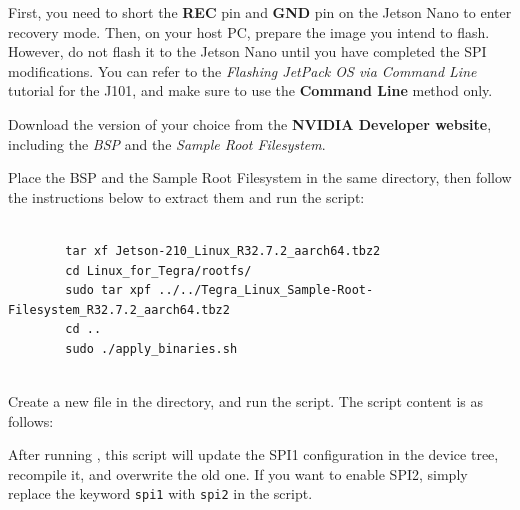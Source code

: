 First, you need to short the \textbf{REC} pin and \textbf{GND} pin on the Jetson Nano to enter recovery mode. 
Then, on your host PC, prepare the image you intend to flash. 
However, do not flash it to the Jetson Nano until you have completed the \ac{SPI} modifications. 
You can refer to the \textit{Flashing JetPack OS via Command Line} tutorial for the J101, and make sure to use the \textbf{Command Line} method only.

\bigskip
\noindent Download the version of your choice from the \textbf{NVIDIA Developer website}, including the \textit{BSP} and the \textit{Sample Root Filesystem}.

\noindent Place the BSP and the Sample Root Filesystem in the same directory, then follow the instructions below to extract them and run the  script:



\begin{tcolorbox}[colback=white,colframe=black,coltext= ShellColor, sharp corners, boxrule=0.8pt]
		\begin{small}
	\begin{verbatim}
		
		tar xf Jetson-210_Linux_R32.7.2_aarch64.tbz2
		cd Linux_for_Tegra/rootfs/
		sudo tar xpf ../../Tegra_Linux_Sample-Root-Filesystem_R32.7.2_aarch64.tbz2
		cd ..
		sudo ./apply_binaries.sh
		
	\end{verbatim}
	\end{small}
\end{tcolorbox}




\noindent Create a new  file in the  directory, and run the script. 
The script content is as follows:


\begingroup

\endgroup
			


\medskip
After running , this script will update the \ac{SPI}1 configuration in the device tree, recompile it, and overwrite the old one. 
If you want to enable \ac{SPI}2, simply replace the keyword \texttt{spi1} with \texttt{spi2} in the  script.

